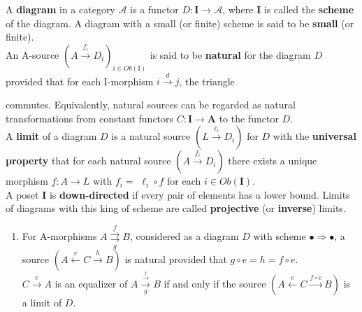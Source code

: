  A \textbf{diagram} in a category $\mathcal{A}$ is a functor $D: \mathbf{I} \rightarrow \mathcal{A}$, where $\mathbf{I}$ is called the \textbf{scheme} of the diagram. A diagram with a small (or finite) scheme is said to be \textbf{small} (or finite).\\
An A-source $\left(A \xrightarrow{f_i} D_i\right)_{i \in O b(\mathrm{I})}$ is said to be \textbf{natural} for the diagram $D$ provided that for each I-morphism $i \xrightarrow{d} j$, the triangle 
 commutes. Equivalently, natural sources can be regarded as natural transformations from constant functors $C: \mathbf{I} \rightarrow \mathbf{A}$ to the functor $D$.\\
A \textbf{limit} of a diagram $D$ is a natural source $\left(L \xrightarrow{\ell_i} D_i\right)$ for $D$ with the \textbf{universal property} that for each natural source $\left(A \xrightarrow{f_i} D_i\right)$ there exists a unique morphism $f: A \rightarrow L$ with $f_i=$ $\ell_i \circ f$ for each $i \in O b(\mathbf{I})$.\\
 A poset $\mathbf{I}$ is \textbf{down-directed} if every pair of elements has a lower bound. Limits of diagrams with this king of scheme are called \textbf{projective} (or \textbf{inverse}) limits. 


\begin{prop}
    
\begin{enumerate}

    \item For A-morphisms $A \underset{g}{\stackrel{f}{\rightrightarrows}} B$, considered as a diagram $D$ with scheme $\bullet \Rightarrow \bullet$, a source $(A \stackrel{e}{\longleftarrow} C \xrightarrow{h} B)$ is natural provided that $g \circ e=h=f \circ e$.\\
    $C \xrightarrow{e} A$ is an equalizer of $A \xrightarrow[g]{\stackrel{f}{\longrightarrow}} B$ if and only if the source $(A \stackrel{e}{\leftarrow} C \xrightarrow{f \circ e} B)$ is a limit of $D$. 
\end{enumerate}
\end{prop}

